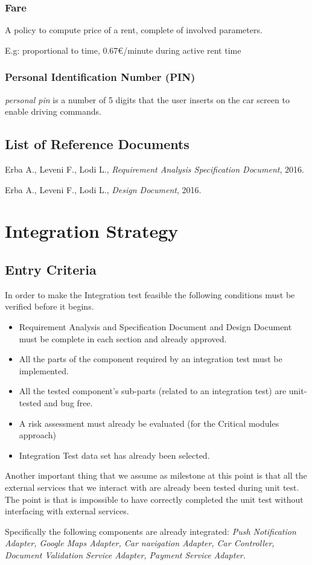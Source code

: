 \documentclass[english]{article}
\newcommand{\personalpin}{\textit{personal pin }}
\begin{document}
	\subsubsection{Fare}
		A policy to compute price of a rent, complete of involved parameters. \par E.g: proportional to time, 0.67\euro/minute during active rent time 
	\subsubsection{Personal Identification Number (PIN)}
		 \personalpin is a number of 5 digits that the user inserts on the car screen to enable driving commands.
	\subsection{List of Reference Documents}
	\begin{thebibliography}{9}

			Erba A., Leveni F., Lodi L.,
  			\emph{Requirement Analysis Specification Document},
 			2016.
 			
			 Erba A., Leveni F., Lodi L.,
  			\emph{Design Document},
 			2016.
	\end{thebibliography}
\section{Integration Strategy}
	\subsection{Entry Criteria}
	In order to make the Integration test feasible the following conditions must be verified before it begins.
		 \begin{itemize}
		 	\item Requirement Analysis and Specification Document and Design Document must be complete in each section and already approved.
		 	\item All the parts of the component required by an integration test must be implemented.
		 	\item All the tested component's sub-parts (related to an integration test) are unit-tested and bug free.
		 	\item A risk assessment must already be evaluated (for the Critical modules approach)
		 	\item Integration Test data set has already been selected.
		\end{itemize}
	Another  important thing that we assume as milestone at this point is that all the external services that we interact with are already been tested during unit test. The point is that is impossible to have correctly completed the unit test without interfacing with external services.
	\par Specifically the following components are already integrated: \textit{Push Notification Adapter, Google Maps Adapter, Car navigation Adapter, Car Controller, Document Validation Service Adapter, Payment Service Adapter.}
\end{document}
